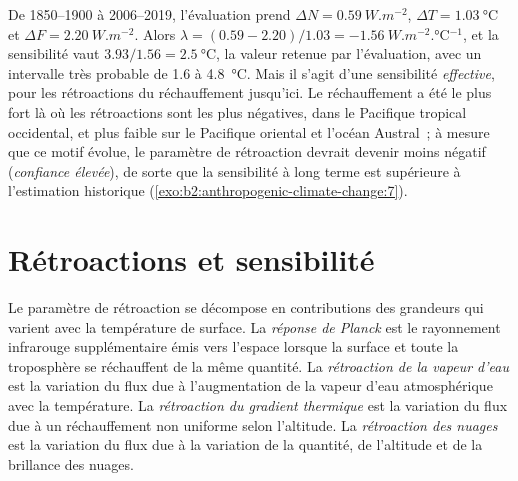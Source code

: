 De 1850--1900 à 2006--2019, l'évaluation prend $\Delta N = \qty{0.59}{W.m^{-2}}$, $\Delta T =
\qty{1.03}{\celsius}$ et $\Delta F = \qty{2.20}{W.m^{-2}}$. Alors $\lambda = (0.59 - 2.20)/1.03 =
\qty{-1.56}{W.m^{-2}.\celsius^{-1}}$, et la sensibilité vaut $3.93/1.56 = \qty{2.5}{\celsius}$, la valeur
retenue par l'évaluation, avec un intervalle très probable de 1.6 à \qty{4.8}{\celsius}. Mais il s'agit
d'une sensibilité \emph{effective}, pour les rétroactions du réchauffement jusqu'ici. Le réchauffement a
été le plus fort là où les rétroactions sont les plus négatives, dans le Pacifique tropical occidental,
et plus faible sur le Pacifique oriental et l'océan Austral~; à mesure que ce motif évolue, le paramètre
de rétroaction devrait devenir moins négatif (\emph{confiance élevée}), de sorte que la sensibilité à
long terme est supérieure à l'estimation historique (\cref{exo:b2:anthropogenic-climate-change:7}).

\section{Rétroactions et sensibilité}\label{sec:b2:anthropogenic-climate-change:feedbacks}

\begin{definition}\label{def:b2:anthropogenic-climate-change:feedbacks}
Le paramètre de rétroaction se décompose en contributions des grandeurs qui varient avec la température de
surface. La \emph{réponse de Planck} est le rayonnement infrarouge supplémentaire
émis vers l'espace lorsque la surface et toute la troposphère se réchauffent de la même quantité. La
\emph{rétroaction de la vapeur d'eau} est la variation du flux due à
l'augmentation de la vapeur d'eau atmosphérique avec la température. La \emph{rétroaction du gradient
thermique} est la variation du flux due à un réchauffement non
uniforme selon l'altitude. La \emph{rétroaction des nuages} est la variation
du flux due à la variation de la quantité, de l'altitude et de la brillance des nuages.
\end{definition}

